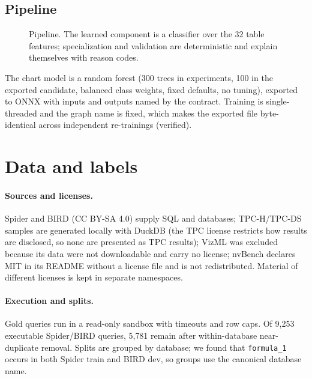 \documentclass[11pt]{article}
\newcommand{\sql}[1]{\texttt{#1}}
\begin{document}
\subsection{Pipeline}
\begin{figure}[h]\centering
{}
\caption{Pipeline. The learned component is a classifier over the 32 table features; specialization and validation are deterministic and explain themselves with reason codes.}
\end{figure}
The chart model is a random forest (300 trees in experiments, 100 in the exported candidate, balanced class weights, fixed defaults, no tuning), exported to ONNX with inputs and outputs named by the contract. Training is single-threaded and the graph name is fixed, which makes the exported file byte-identical across independent re-trainings (verified).

\section{Data and labels}\label{sec:data}
\paragraph{Sources and licenses.} Spider and BIRD (CC BY-SA 4.0) supply SQL and databases; TPC-H/TPC-DS samples are generated locally with DuckDB (the TPC license restricts how results are disclosed, so none are presented as TPC results); VizML was excluded because its data were not downloadable and carry no license; nvBench declares MIT in its README without a license file and is not redistributed. Material of different licenses is kept in separate namespaces.
\paragraph{Execution and splits.} Gold queries run in a read-only sandbox with timeouts and row caps. Of 9{,}253 executable Spider/BIRD queries, 5{,}781 remain after within-database near-duplicate removal. Splits are grouped by database; we found that \sql{formula\_1} occurs in both Spider train and BIRD dev, so groups use the canonical database name.
\end{document}
